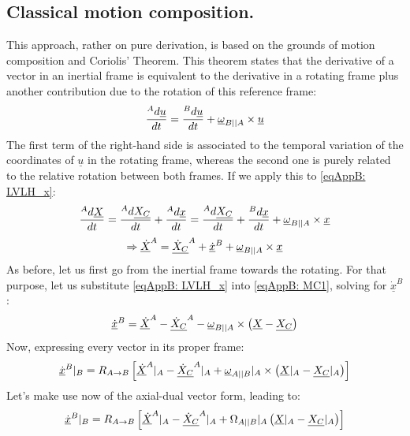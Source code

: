 	\subsection{Classical motion composition.}
	\indent This approach, rather on pure derivation, is based on the grounds of motion composition and Coriolis' Theorem. This theorem states that the derivative of a vector in an inertial frame is equivalent to the derivative in a rotating frame plus another contribution due to the rotation of this reference frame:
	\[
	\dfrac{^{A}d \underline{u}}{dt} = \dfrac{^{B}d \underline{u}}{dt} + \underline{\omega}_{B\vert \vert A} \times \underline{u}
	\]
	\indent The first term of the right-hand side is associated to the temporal variation of the coordinates of $\underline{u}$ in the rotating frame, whereas the second one is purely related to the relative rotation between both frames. If we apply this to \ref{eqAppB: 	LVLH_x}:
	\[
	\dfrac{^{A}d \underline{X}}{dt} = \dfrac{^{A}d \underline{X_C}}{dt} + \dfrac{^{A}d \underline{x}}{dt} = \dfrac{^{A}d \underline{X_C}}{dt} + \dfrac{^{B}d \underline{x}}{dt} + \underline{\omega}_{B\vert \vert A} \times \underline{x}
	\]
	\begin{equation}
	\Rightarrow \underline{\dot{X}}^{A} = \underline{\dot{X}_C}^{A} + \underline{\dot{x}}^{B} + \underline{\omega}_{B\vert \vert A} \times \underline{x}
	\label{eqAppB: 	MC1}
	\end{equation}
	\indent As before, let us first go from the inertial frame towards the rotating. For that purpose, let us substitute \eqref{eqAppB: 	LVLH_x} into \eqref{eqAppB: 	MC1}, solving for $\underline{\dot{x}}^{B}$:
	\begin{equation}
	\underline{\dot{x}}^{B} = \underline{\dot{X}}^{A} - \underline{\dot{X}_C}^{A} - \underline{\omega}_{B\vert \vert A} \times \left(\underline{X} - \underline{X_C} \right)
	\end{equation}
	\indent Now, expressing every vector in its proper frame:
	\begin{equation}
	\underline{\dot{x}}^{B}\rvert_{B} = R_{A\to B} \left[\underline{\dot{X}}^{A}\rvert_{A} - \underline{\dot{X}_C}^{A}\rvert_{A} + \underline{\omega}_{A\vert \vert B}\rvert_{A} \times \left(\underline{X}\rvert_{A} - \underline{X_C}\rvert_{A} \right)\right]
	\end{equation}
	\indent Let's make use now of the axial-dual vector form, leading to:
	\begin{equation}
	\underline{\dot{x}}^{B}\rvert_{B} = R_{A\to B} \left[\underline{\dot{X}}^{A}\rvert_{A} - \underline{\dot{X}_C}^{A}\rvert_{A} + \Omega_{A\vert \vert B}\rvert_{A} \left(\underline{X}\rvert_{A} - \underline{X_C}\rvert_{A} \right)\right]
	\end{equation}
